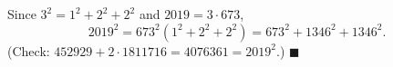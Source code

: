 Since $3^2=1^2+2^2+2^2$ and $2019=3\cdot673$,
\[2019^2=673^2\left(1^2+2^2+2^2\right)=\boxed{673^2+1346^2+1346^2}.\]
(Check: $452929+2\cdot1811716=4076361=2019^2$.) $\blacksquare$
